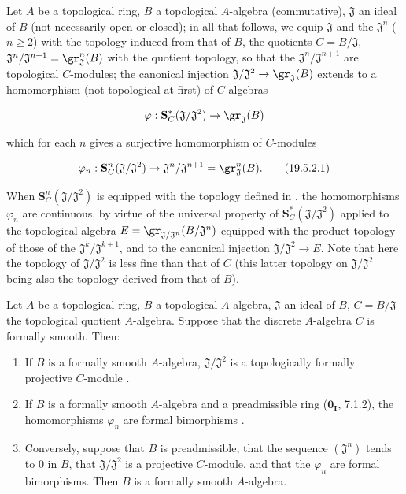 \begin{env}[19.5.2]
\label{0.19.5.2}
Let $A$ be a topological ring, $B$ a topological $A$-algebra (commutative), $\mathfrak{J}$ an ideal of $B$ (not necessarily open or closed);
in all that follows, we equip $\mathfrak{J}$ and the $\mathfrak{J}^n$ ($n\geq 2$) with the topology induced from that of $B$, the quotients $C=B/\mathfrak{J}$, $\mathfrak{J}^n/\mathfrak{J}^{n+1}=\gr_\mathfrak{J}^n(B)$ with the quotient topology, so that the $\mathfrak{J}^n/\mathfrak{J}^{n+1}$ are topological $C$-modules;
the canonical injection $\mathfrak{J}/\mathfrak{J}^2\to\gr_\mathfrak{J}(B)$ extends to a homomorphism (not topological at first) of $C$-algebras

\[
\varphi:\mathbf{S}_C^*(\mathfrak{J}/\mathfrak{J}^2) \to \gr_\mathfrak{J}(B)
\]

which for each $n$ gives a surjective homomorphism of $C$-modules

\[
\varphi_n:\mathbf{S}_C^n(\mathfrak{J}/\mathfrak{J}^2) \to \mathfrak{J}^n/\mathfrak{J}^{n+1}=\gr_\mathfrak{J}^n(B). \tag{19.5.2.1}
\]

\label{0.19.5.2.1}

When $\mathbf{S}_C^n(\mathfrak{J}/\mathfrak{J}^2)$ is equipped with the topology defined in , the homomorphisms $\varphi_n$ are continuous, by virtue of the universal property  of $\mathbf{S}_C^*(\mathfrak{J}/\mathfrak{J}^2)$ applied to the topological algebra $E=\gr_{\mathfrak{J}/\mathfrak{J}^n}(B/\mathfrak{J}^n)$ equipped with the product topology of those of the $\mathfrak{J}^k/\mathfrak{J}^{k+1}$, and to the canonical injection $\mathfrak{J}/\mathfrak{J}^2\to E$.
Note that here the topology of $\mathfrak{J}/\mathfrak{J}^2$ is less fine than that of $C$ (this latter topology on $\mathfrak{J}/\mathfrak{J}^2$ being also the topology derived from that of $B$).
\end{env}

\begin{theorem}[19.5.3]
\label{0.19.5.3}
Let $A$ be a topological ring, $B$ a topological $A$-algebra, $\mathfrak{J}$ an ideal of $B$, $C=B/\mathfrak{J}$ the topological quotient $A$-algebra.
Suppose that the discrete $A$-algebra $C$ is formally smooth.
Then:
\begin{enumerate}
  \item[\rm(i)] If $B$ is a formally smooth $A$-algebra, $\mathfrak{J}/\mathfrak{J}^2$ is a topologically formally projective $C$-module .
  \item[\rm(ii)] If $B$ is a formally smooth $A$-algebra and a preadmissible ring ($\mathbf{0_I}$, 7.1.2), the homomorphisms $\varphi_n$  are formal bimorphisms .
  \item[\rm(iii)] Conversely, suppose that $B$ is preadmissible, that the sequence $(\mathfrak{J}^n)$ tends to $0$ in $B$, that $\mathfrak{J}/\mathfrak{J}^2$ is a projective $C$-module, and that the $\varphi_n$ are formal bimorphisms. Then $B$ is a formally smooth $A$-algebra.
\end{enumerate}
\end{theorem}

